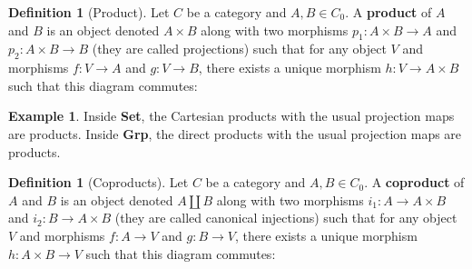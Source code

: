 \documentclass{scrartcl}
\theoremstyle{definition}
\newtheorem{defn}[thm]{Definition}
\newtheorem{exmp}[thm]{Example}
\theoremstyle{remark}
\begin{document}
\begin{defn}[Product]
    Let $C$ be a category and $A,B \in C_0$. A \textbf{product} of $A$ and $B$ is an object denoted $A \times B$ along with two morphisms $p_1: A\times B \rightarrow A$ and $p_2:A\times B \rightarrow B$ (they are called projections) such that for any object $V$ and morphisms $f:V\rightarrow A$ and $g:V\rightarrow B$, there exists a unique morphism $h:V\rightarrow A\times B$ such that this diagram commutes:
    \begin{figure}[h]
        \centering
    \end{figure}
\end{defn}
\begin{exmp}
    Inside \textbf{Set}, the Cartesian products with the usual projection maps are products. Inside \textbf{Grp}, the direct products with the usual projection maps are products.
\end{exmp}

\begin{defn}[Coproducts]
     Let $C$ be a category and $A,B \in C_0$. A \textbf{coproduct} of $A$ and $B$ is an object denoted $A \amalg B$ along with two morphisms $i_1: A \rightarrow A\times B$ and $i_2: B \rightarrow A\times B$ (they are called canonical injections) such that for any object $V$ and morphisms $f:A\rightarrow V$ and $g:B\rightarrow V$, there exists a unique morphism $h: A\times B\rightarrow V$ such that this diagram commutes:
     \begin{figure}[h]
        \centering
     \end{figure}
\end{defn}
\end{document}

